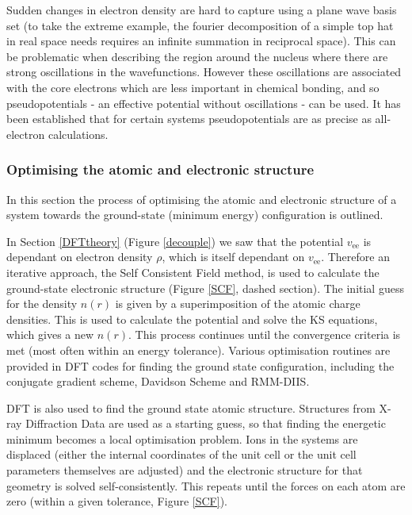 Sudden changes in electron density are hard to capture using a plane wave basis set (to take the extreme example, the fourier decomposition of a simple top hat in real space needs requires an infinite summation in reciprocal space). This can be problematic when describing the region around the nucleus where there are strong oscillations in the wavefunctions. However these oscillations are associated with the core electrons which are less important in chemical bonding, and so pseudopotentials - an effective potential without oscillations - can be used. It has been established that for certain systems pseudopotentials are as precise as all-electron calculations.\autocite{Lejaeghere2016}

\subsubsection{Optimising the atomic and electronic structure}

In this section the process of optimising the atomic and electronic structure of a system towards the ground-state (minimum energy) configuration is outlined. 

In Section \ref{DFTtheory} (Figure \ref{decouple}) we saw that the potential $v_\textrm{ee}$ is dependant on electron density $\rho$, which is itself dependant on $v_\textrm{ee
}$. Therefore an iterative approach, the Self Consistent Field method, is used to calculate the ground-state electronic structure (Figure \ref{SCF}, dashed section). The initial guess for the density $n(r)$ is given by a superimposition of the atomic charge densities. This is used to calculate the potential and solve the KS equations, which gives a new $n(r)$. This process continues until the convergence criteria is met (most often within an energy tolerance). Various optimisation routines are provided in DFT codes for finding the ground state configuration, including the conjugate gradient scheme, Davidson Scheme and RMM-DIIS.

DFT is also used to find the ground state atomic structure. Structures from X-ray Diffraction Data are used as a starting guess, so that finding the energetic minimum becomes a local optimisation problem. Ions in the systems are displaced (either the internal coordinates of the unit cell or the unit cell parameters themselves are adjusted) and the electronic structure for that geometry is solved self-consistently. This repeats until the forces on each atom are zero (within a given tolerance, Figure \ref{SCF}). 

